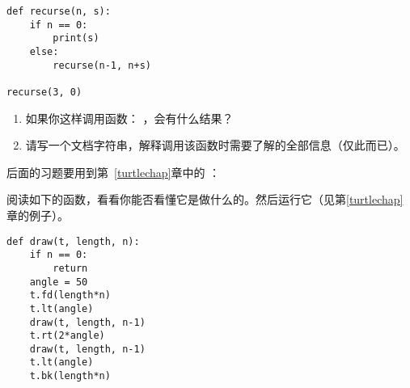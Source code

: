 {{{{\begin{exercise}
\begin{em}
\begin{lstlisting}
def recurse(n, s):
    if n == 0:
        print(s)
    else:
        recurse(n-1, n+s)

recurse(3, 0)
\end{lstlisting}
\end{em}





\begin{enumerate}

\item 如果你这样调用函数： {\em {}} ，会有什么结果？

\item 请写一个文档字符串，解释调用该函数时需要了解的全部信息（仅此而已）。

\end{enumerate}

\end{exercise}


后面的习题要用到第~\ref{turtlechap}章中的 ：

\begin{exercise}


阅读如下的函数，看看你能否看懂它是做什么的。然后运行它（见第\ref{turtlechap}章的例子）。

\begin{em}
\begin{lstlisting}
def draw(t, length, n):
    if n == 0:
        return
    angle = 50
    t.fd(length*n)
    t.lt(angle)
    draw(t, length, n-1)
    t.rt(2*angle)
    draw(t, length, n-1)
    t.lt(angle)
    t.bk(length*n)
\end{lstlisting}
\end{em}


\end{exercise}}}}}
